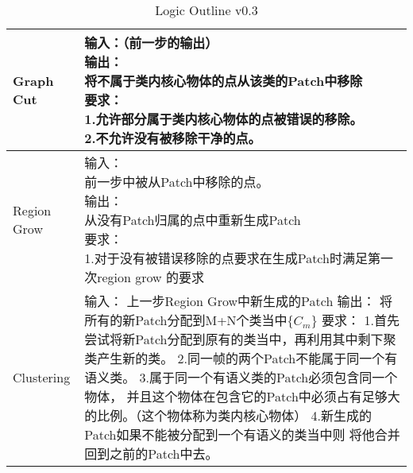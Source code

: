 \begin{table*}[!hbp]
\begin{tabular}{p{}|p{}}
		\hline
		Graph Cut&\tabincell{l}{
			输入：（前一步的输出）\\
			输出：\\
			将不属于类内核心物体的点从该类的Patch中移除\\
			要求：\\
			1.允许部分属于类内核心物体的点被错误的移除。\\
			2.不允许没有被移除干净的点。}\\
		\hline
		Region Grow&\tabincell{l}{
			输入：\\
			前一步中被从Patch中移除的点。\\
			输出：\\
			从没有Patch归属的点中重新生成Patch\\
			要求：\\
			1.对于没有被错误移除的点要求在生成Patch时满足第一次region grow 的要求}\\
		\hline
		Clustering&\tabincell{l}{
			输入：\\
			上一步Region Grow中新生成的Patch\\
			输出：\\
			将所有的新Patch分配到M+N个类当中$\{C_m\}$\\
			要求：\\
			1.首先尝试将新Patch分配到原有的类当中，再利用其中剩下聚类产生新的类。\\
			2.同一帧的两个Patch不能属于同一个有语义类。\\
			3.属于同一个有语义类的Patch必须包含同一个物体，\\并且这个物体在包含它的Patch中必须占有足够大的比例。（这个物体称为类内核心物体）\\
			4.新生成的Patch如果不能被分配到一个有语义的类当中则\\将他合并回到之前的Patch中去。
		}\\
		\hline
	\end{tabular}
	\caption{Logic Outline v0.3} %
	\label{tab:logic_outline03}
\end{table*}